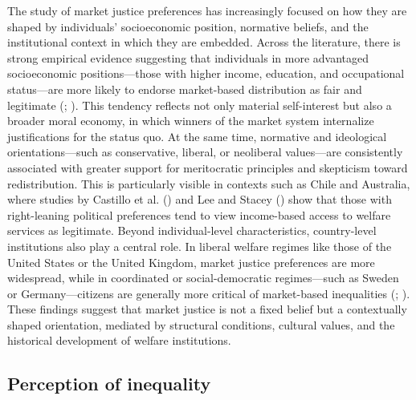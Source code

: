 \documentclass[
  12pt,
]{article}
\begin{document}
The study of market justice preferences has increasingly focused on how
they are shaped by individuals' socioeconomic position, normative
beliefs, and the institutional context in which they are embedded.
Across the literature, there is strong empirical evidence suggesting
that individuals in more advantaged socioeconomic positions---those with
higher income, education, and occupational status---are more likely to
endorse market-based distribution as fair and legitimate
(;
). This tendency
reflects not only material self-interest but also a broader moral
economy, in which winners of the market system internalize
justifications for the status quo. At the same time, normative and
ideological orientations---such as conservative, liberal, or neoliberal
values---are consistently associated with greater support for
meritocratic principles and skepticism toward redistribution. This is
particularly visible in contexts such as Chile and Australia, where
studies by Castillo et al.
() and Lee and Stacey
() show that those with
right-leaning political preferences tend to view income-based access to
welfare services as legitimate. Beyond individual-level characteristics,
country-level institutions also play a central role. In liberal welfare
regimes like those of the United States or the United Kingdom, market
justice preferences are more widespread, while in coordinated or
social-democratic regimes---such as Sweden or Germany---citizens are
generally more critical of market-based inequalities
(;
). These findings suggest
that market justice is not a fixed belief but a contextually shaped
orientation, mediated by structural conditions, cultural values, and the
historical development of welfare institutions.

\subsection{Perception of inequality}\label{perception-of-inequality}
\end{document}
